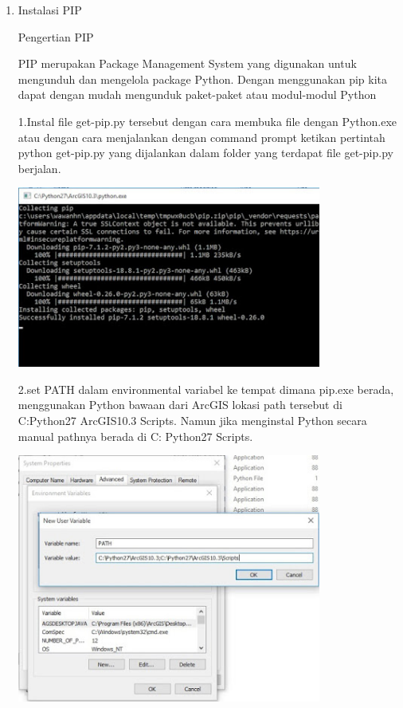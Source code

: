 \begin{enumerate}
      
    `\item Instalasi PIP
    
    Pengertian PIP
    
    PIP merupakan Package Management System yang digunakan untuk mengunduh dan mengelola package Python. Dengan menggunakan pip kita dapat dengan mudah mengunduk paket-paket atau modul-modul Python
        \begin{enumerate}
        
    1.Instal file get-pip.py tersebut dengan cara membuka file dengan Python.exe atau dengan cara menjalankan dengan command prompt ketikan pertintah python get-pip.py yang dijalankan dalam folder yang terdapat file get-pip.py berjalan.
    
   \begin{center}
            \includegraphics[width=10cm]{figures/pip1.jpg}
        \end{center}
    
    2.set PATH dalam environmental variabel ke tempat dimana pip.exe berada, menggunakan Python bawaan dari ArcGIS lokasi path tersebut di C:Python27 ArcGIS10.3 Scripts. Namun jika menginstal Python secara manual  pathnya berada di C: Python27 Scripts.
    \begin{center}
            \includegraphics[width=10cm]{figures/pip2.jpg}
        \end{center}
    

\end{enumerate}
\end{enumerate}
